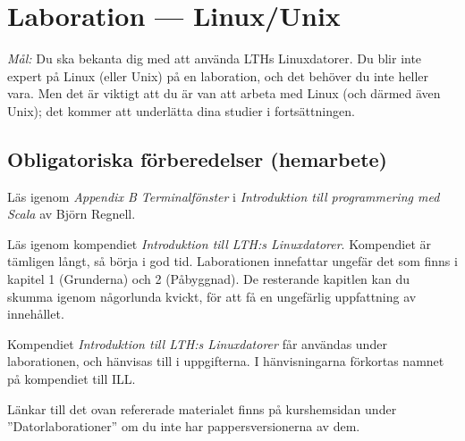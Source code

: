 \section{Laboration  --- Linux/Unix}
\label{lab:unix}
\emph{Mål:} Du ska bekanta dig med att använda LTHs Linuxdatorer. Du blir inte expert på Linux (eller Unix) på en laboration, och det behöver du inte heller vara. Men det är viktigt att du är van att arbeta med Linux (och därmed även Unix); det kommer att underlätta dina studier i fortsättningen.


\subsection*{Obligatoriska förberedelser (hemarbete)}
\begin{Hemarbete}
	\item Läs igenom \emph{Appendix B Terminalfönster} i \emph{Introduktion till programmering med Scala} av Björn Regnell.
	\item Läs igenom kompendiet  \emph{Introduktion till LTH:s Linuxdatorer}. Kompendiet är tämligen långt, så börja i god tid. Laborationen innefattar ungefär det som finns i kapitel 1 (Grunderna) och 2 (Påbyggnad). De resterande kapitlen kan du skumma igenom  någorlunda kvickt, för att få en ungefärlig uppfattning av innehållet.
	\item Kompendiet \emph{Introduktion till LTH:s Linuxdatorer} får användas under laborationen, och hänvisas till i uppgifterna. I hänvisningarna förkortas namnet på  kompendiet till ILL.
\end{Hemarbete}
Länkar till det ovan refererade materialet finns på kurshemsidan under  ''Datorlaborationer'' om du inte har pappersversionerna av dem.


